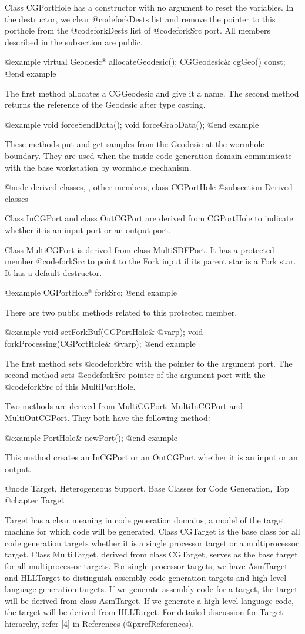 Class CGPortHole has a constructor with no argument to reset the variables.
In the destructor, we clear @code{forkDests} list and remove the pointer
to this porthole from the @code{forkDests} list of @code{forkSrc} port.
All members described in the subsection are public.

@example
virtual Geodesic* allocateGeodesic();
CGGeodesic& cgGeo() const;
@end example

The first method allocates a CGGeodesic and give it a name.
The second method returns the reference of the Geodesic after type casting.

@example
void forceSendData();
void forceGrabData();
@end example

These methods put and get samples from the Geodesic at the wormhole
boundary. They are used when the inside code generation domain
communicate with the base workstation by wormhole mechanism.

@node derived classes, , other members, class CGPortHole
@subsection Derived classes

Class InCGPort and class OutCGPort are derived from CGPortHole to indicate
whether it is an input port or an output port.

Class MultiCGPort is derived from class MultiSDFPort. It has a protected
member @code{forkSrc} to point to the Fork input if its parent star
is a Fork star. It has a default destructor.

@example
CGPortHole* forkSrc;
@end example

There are two public methods related to this protected member.

@example
void setForkBuf(CGPortHole& @var{p});
void forkProcessing(CGPortHole& @var{p});
@end example

The first method sets @code{forkSrc} with the pointer to the argument port.
The second method sets @code{forkSrc} pointer of the argument port with
the @code{forkSrc} of this MultiPortHole.

Two methods are derived from MultiCGPort: MultiInCGPort and MultiOutCGPort.
They both have the following method:

@example
PortHole& newPort();
@end example

This method creates an InCGPort or an OutCGPort whether it is an input or an
output.

@node Target, Heterogeneous Support, Base Classes for Code Generation, Top
@chapter Target

Target has a clear meaning in code generation domains, a model of
the target machine for which code will be generated. Class CGTarget is the
base class for all code generation targets whether it is a single
processor target or a multiprocessor target. Class MultiTarget,
derived from class CGTarget, serves as the base target for all
multiprocessor targets. 
For
single processor targets, we have AsmTarget and HLLTarget to distinguish
assembly code generation targets and high level language generation targets.
If we generate assembly code for a target, the target will be derived from
class AsmTarget. If we generate a high level language code, the target
will be derived from HLLTarget. For detailed discussion for Target
hierarchy, refer [4] in References (@pxref{References}).

